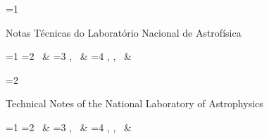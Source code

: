 
\thispagestyle{capa}
\hfill
\vspace{2cm}

\ifnum\value{linguagemdocumento}=1
    \begin{center}
        {\Large Notas Técnicas do Laboratório Nacional de Astrofísica}

        \vspace{6cm}

        {\LARGE \textbf{\titulonotatecnica}}

        \hfill

        \vspace{1cm}

        {\large \ifnum\value{numerodeautores}=1 \autornotatecnica%
            \else \ifnum\value{numerodeautores}=2 \autornotatecnica \, \& \segundoautor%
                \else \ifnum\value{numerodeautores}=3 \autornotatecnica, \segundoautor \, \& \terceiroautor%
                    \else \ifnum\value{numerodeautores}=4 \autornotatecnica, \segundoautor, \terceiroautor \, \& \quartoautor%
                        \fi \fi \fi \fi
        }

        \vfill

        \Large \numeronotatecnica%

        \Large \datanotatecnica%

    \end{center}
\fi

\ifnum\value{linguagemdocumento}=2
    \begin{center}
        {\Large Technical Notes of the National Laboratory of Astrophysics}

        \vspace{6cm}

        {\LARGE \textbf{\titulonotatecnica}}

        \hfill

        \vspace{1cm}

        {\large \ifnum\value{numerodeautores}=1 \autornotatecnica%
            \else \ifnum\value{numerodeautores}=2 \autornotatecnica \, \& \segundoautor%
                \else \ifnum\value{numerodeautores}=3 \autornotatecnica, \segundoautor \, \& \terceiroautor%
                    \else \ifnum\value{numerodeautores}=4 \autornotatecnica, \segundoautor, \terceiroautor \, \& \quartoautor%
                        \fi \fi \fi \fi
        }

        \vfill

        \Large \numeronotatecnica%

        \Large \datanotatecnica%
    \end{center}
\fi